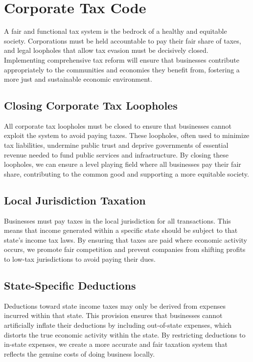 \section{Corporate Tax Code}\label{sec:corporate-tax-code}
A fair and functional tax system is the bedrock of a healthy and equitable society.
Corporations must be held accountable to pay their fair share of taxes, and legal loopholes that allow tax evasion must be decisively closed.
Implementing comprehensive tax reform will ensure that businesses contribute appropriately to the communities and economies they benefit from, fostering a more just and sustainable economic environment.

\subsection*{Closing Corporate Tax Loopholes}
All corporate tax loopholes must be closed to ensure that businesses cannot exploit the system to avoid paying taxes.
These loopholes, often used to minimize tax liabilities, undermine public trust and deprive governments of essential revenue needed to fund public services and infrastructure.
By closing these loopholes, we can ensure a level playing field where all businesses pay their fair share, contributing to the common good and supporting a more equitable society.

\subsection*{Local Jurisdiction Taxation}
Businesses must pay taxes in the local jurisdiction for all transactions.
This means that income generated within a specific state should be subject to that state's income tax laws.
By ensuring that taxes are paid where economic activity occurs, we promote fair competition and prevent companies from shifting profits to low-tax jurisdictions to avoid paying their dues.

\subsection*{State-Specific Deductions}
Deductions toward state income taxes may only be derived from expenses incurred within that state.
This provision ensures that businesses cannot artificially inflate their deductions by including out-of-state expenses, which distorts the true economic activity within the state.
By restricting deductions to in-state expenses, we create a more accurate and fair taxation system that reflects the genuine costs of doing business locally.

